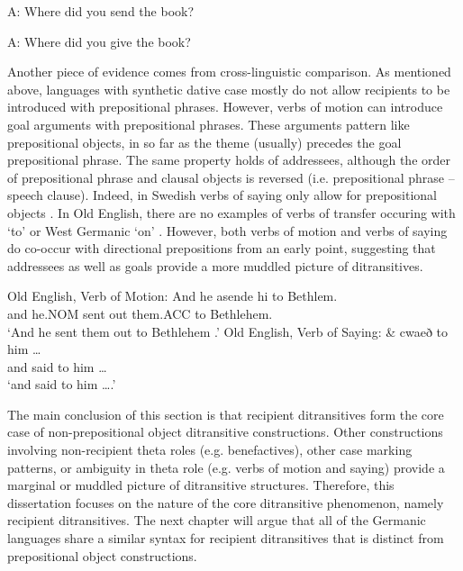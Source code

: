 \documentclass[11pt]{upenndiss}
\begin{document}
\begin{exe}
	\ex A: Where did you send the book?
	\begin{xlist}
	\end{xlist}
	\ex A: Where did you give the book?
	\begin{xlist}
		\ex[*]{B: To my sister.}
		\ex[ ]{B: At the post office.}
	\end{xlist}
\end{exe}

Another piece of evidence comes from cross-linguistic comparison. As mentioned above, languages with synthetic dative case mostly do not allow recipients to be introduced with prepositional phrases. However, verbs of motion can introduce goal arguments with prepositional phrases. These arguments pattern like prepositional objects, in so far as the theme (usually) precedes the goal prepositional phrase. The same property holds of addressees, although the order of prepositional phrase and clausal objects is reversed (i.e. prepositional phrase -- speech clause). Indeed, in Swedish verbs of saying only allow for prepositional objects \citep{Lundquist.2013b}. In Old English, there are no examples of verbs of transfer occuring with `to' or West Germanic `on' \citep{McFadden.2002}. However, both verbs of motion and verbs of saying do co-occur with directional prepositions from an early point, suggesting that addressees as well as goals provide a more muddled picture of ditransitives.

\begin{exe}
	\ex Old English, Verb of Motion:
		\gll And he asende hi to Bethlem.\\
		and he.NOM {sent out} them.ACC to Bethlehem.\\
		\trans `And he sent them out to Bethlehem \citep[cowsgosp:2.8.77]{Taylor.2003}.'
	\ex Old English, Verb of Saying:
		\gll \& cwaeð to him \ldots\\
		and said to him \ldots\\
		\trans `and said to him \ldots \citep[cowsgosp:4.6.169]{Taylor.2003}.'
\end{exe}

The main conclusion of this section is that recipient ditransitives form the core case of non-prepositional object ditransitive constructions. Other constructions involving non-recipient theta roles (e.g. benefactives), other case marking patterns, or ambiguity in theta role (e.g. verbs of motion and saying) provide a marginal or muddled picture of ditransitive structures. Therefore, this dissertation focuses on the nature of the core ditransitive phenomenon, namely recipient ditransitives. The next chapter will argue that all of the Germanic languages share a similar syntax for recipient ditransitives that is distinct from prepositional object constructions.
\end{document}
